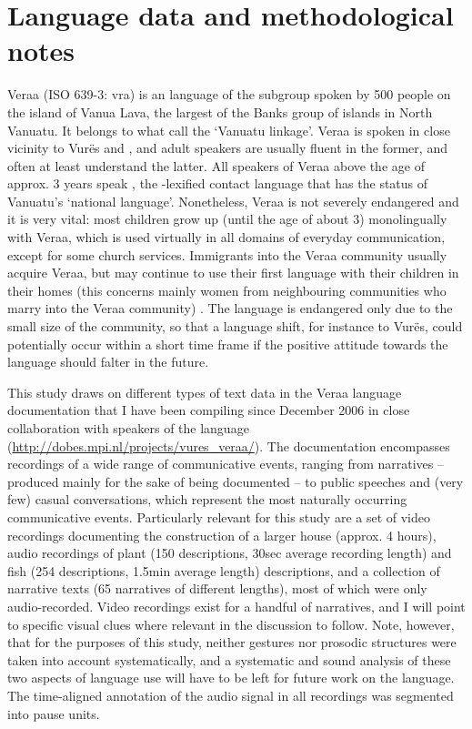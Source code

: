 \documentclass[output=paper
,modfonts
,nonflat]{langsci/langscibook}
\begin{document}
\section{Language data and methodological notes} \label{section2}
Vera{\textquotesingle}a (ISO 639-3: vra) is an  language of the  subgroup spoken by 500 people on the island of Vanua Lava, the largest of the Banks group of islands in North Vanuatu. It belongs to what \cite{KalyanFrancoisfc} call the `Vanuatu linkage'. Vera{\textquotesingle}a is spoken in close vicinity to Vur\"es \citep{Malau2016} and  \citep{Francois2001}, and adult speakers are usually fluent in the former, and often at least understand the latter. All speakers of Vera{\textquotesingle}a above the age of approx. 3 years speak , the -lexified contact language that has the status of Vanuatu's `national language'. Nonetheless, Vera{\textquotesingle}a is not severely endangered and it is very vital: most children grow up (until the age of about 3) monolingually with Vera{\textquotesingle}a, which is used virtually in all domains of everyday communication, except for some church services. Immigrants into the Vera{\textquotesingle}a community usually acquire Vera{\textquotesingle}a, but may continue to use their first language with their children in their homes (this concerns mainly women from neighbouring communities who marry into the Vera{\textquotesingle}a community) \citep[cf.][]{Francois2012}. The language is endangered only due to the small size of the community, so that a language shift, for instance to Vur\"es, could potentially occur within a short time frame if the positive attitude towards the language should falter in the future.

This study draws on different types of text data in the Vera{\textquotesingle}a language documentation that I have been compiling since December 2006 in close collaboration with speakers of the language (\url{http://dobes.mpi.nl/projects/vures\_veraa/}). The documentation encompasses recordings of a wide range of communicative events, ranging from narratives -- produced mainly for the sake of  being documented -- to public speeches and (very few) casual conversations, which represent the most naturally occurring communicative events. Particularly relevant for this study are a set of video recordings documenting the construction of a larger house (approx. 4 hours), audio recordings of plant (150 descriptions, 30sec average recording length) and fish (254 descriptions, 1.5min average length) descriptions, and a collection of narrative texts (65 narratives of different lengths), most of which were only audio-recorded. Video recordings exist for a handful of narratives, and I will point to specific visual clues where relevant in the discussion to follow. Note, however, that for the purposes of this study, neither gestures nor prosodic structures were taken into account systematically, and a systematic and sound analysis of these two aspects of language use will have to be left for future work on the language. The time-aligned annotation of the audio signal in all recordings was segmented into pause units.
\end{document}
